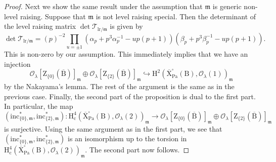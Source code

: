 \documentclass[10pt]{amsart}
\numberwithin{equation}{section}
\theoremstyle{definition}
\def\Pa{\mathrm{Pa}}
\def\calO{\mathcal{O}}
\def\calT{\mathcal{T}}
\def\fracm{\mathfrak{m}}
\def\rmc{\mathrm{c}}
\def\rmB{\mathrm{B}}
\def\rmH{\mathrm{H}}
\def\rmX{\mathrm{X}}
\def\rmZ{\mathrm{Z}}
\begin{document}
\begin{proof}
Next we show the same result under the assumption that $\fracm$ is generic non-level raising. Suppose that  $\fracm$ is not level raising special. Then the determinant of the level raising matrix $\det \calT_{\mathrm{lr}/\fracm}$ is given by 
\begin{equation*}
\det \calT_{\mathrm{lr}/\fracm}= (p)^{-2}\prod_{u=\pm1}(\alpha_{p}+p^{3}\alpha^{-1}_{p}-u p(p+1))(\beta_{p}+p^{3}\beta^{-1}_{p}-u p(p+1)).  
\end{equation*}
This is non-zero by our assumption. This immediately implies that we have an injection
\begin{equation*}
\calO_{\lambda}[\rmZ_{\{0\}}(\overline{\rmB})]_{\fracm}\oplus\calO_{\lambda}[\rmZ_{\{2\}}(\overline{\rmB})]_{\fracm}\hookrightarrow \rmH^{2}(\overline{\rmX}^{\square}_{\Pa}(\rmB), \calO_{\lambda}(1))_{\fracm}
\end{equation*}
by the Nakayama's lemma. The rest of the argument is the same as in the previous case. Finally, the second part of the proposition is dual to the first part. In particular, the map
\begin{equation*}
 (\mathrm{inc}^{\ast}_{\{0\}, \fracm}, \mathrm{inc}^{\ast}_{\{2\}, \fracm}): \rmH^{4}_{\rmc}(\overline{\rmX}^{\square}_{\Pa}(\rmB), \calO_{\lambda}(2))_{\fracm}\rightarrow \calO_{\lambda}[\rmZ_{\{0\}}(\overline{\rmB})]_{\fracm}\oplus\calO_{\lambda}[\rmZ_{\{2\}}(\overline{\rmB})]_{\fracm} 
\end{equation*}
is surjective. Using the same argument as in the first part, we see that $(\mathrm{inc}^{\ast}_{\{0\}, \fracm}, \mathrm{inc}^{\ast}_{\{2\}, \fracm})$
is an isomorphism up to the torsion in $\rmH^{4}_{\rmc}(\overline{\rmX}^{\square}_{\Pa}(\rmB), \calO_{\lambda}(2))_{\fracm}$. The second part now follows.
\end{proof}
\end{document}
